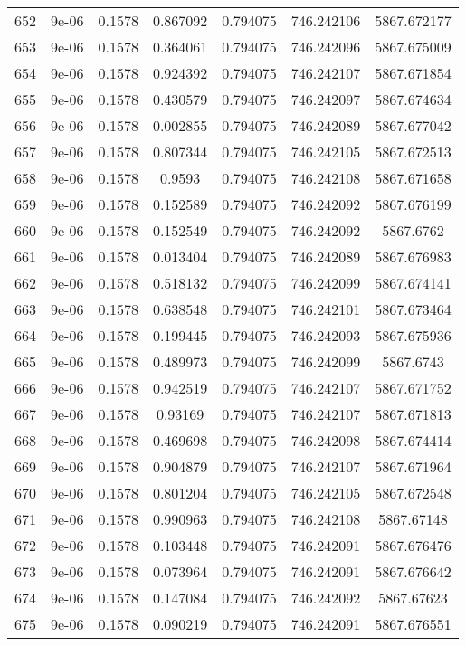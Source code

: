 \begin{table}
\begin{tabular*}{\linewidth}{c|c|c|c|c|c|c}
652 & 9e-06 & 0.1578 & 0.867092 & 0.794075 & 746.242106 & 5867.672177\\
653 & 9e-06 & 0.1578 & 0.364061 & 0.794075 & 746.242096 & 5867.675009\\
654 & 9e-06 & 0.1578 & 0.924392 & 0.794075 & 746.242107 & 5867.671854\\
655 & 9e-06 & 0.1578 & 0.430579 & 0.794075 & 746.242097 & 5867.674634\\
656 & 9e-06 & 0.1578 & 0.002855 & 0.794075 & 746.242089 & 5867.677042\\
657 & 9e-06 & 0.1578 & 0.807344 & 0.794075 & 746.242105 & 5867.672513\\
658 & 9e-06 & 0.1578 & 0.9593 & 0.794075 & 746.242108 & 5867.671658\\
659 & 9e-06 & 0.1578 & 0.152589 & 0.794075 & 746.242092 & 5867.676199\\
660 & 9e-06 & 0.1578 & 0.152549 & 0.794075 & 746.242092 & 5867.6762\\
661 & 9e-06 & 0.1578 & 0.013404 & 0.794075 & 746.242089 & 5867.676983\\
662 & 9e-06 & 0.1578 & 0.518132 & 0.794075 & 746.242099 & 5867.674141\\
663 & 9e-06 & 0.1578 & 0.638548 & 0.794075 & 746.242101 & 5867.673464\\
664 & 9e-06 & 0.1578 & 0.199445 & 0.794075 & 746.242093 & 5867.675936\\
665 & 9e-06 & 0.1578 & 0.489973 & 0.794075 & 746.242099 & 5867.6743\\
666 & 9e-06 & 0.1578 & 0.942519 & 0.794075 & 746.242107 & 5867.671752\\
667 & 9e-06 & 0.1578 & 0.93169 & 0.794075 & 746.242107 & 5867.671813\\
668 & 9e-06 & 0.1578 & 0.469698 & 0.794075 & 746.242098 & 5867.674414\\
669 & 9e-06 & 0.1578 & 0.904879 & 0.794075 & 746.242107 & 5867.671964\\
670 & 9e-06 & 0.1578 & 0.801204 & 0.794075 & 746.242105 & 5867.672548\\
671 & 9e-06 & 0.1578 & 0.990963 & 0.794075 & 746.242108 & 5867.67148\\
672 & 9e-06 & 0.1578 & 0.103448 & 0.794075 & 746.242091 & 5867.676476\\
673 & 9e-06 & 0.1578 & 0.073964 & 0.794075 & 746.242091 & 5867.676642\\
674 & 9e-06 & 0.1578 & 0.147084 & 0.794075 & 746.242092 & 5867.67623\\
675 & 9e-06 & 0.1578 & 0.090219 & 0.794075 & 746.242091 & 5867.676551\\
\end{tabular*}
\end{table}
